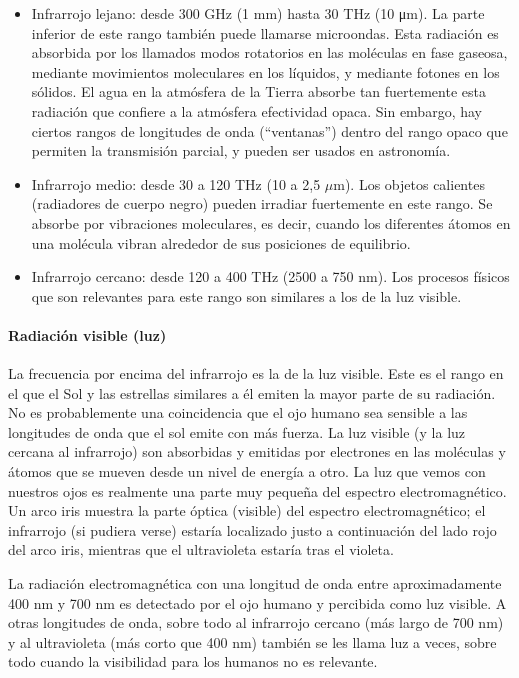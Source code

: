\documentclass[12pt]{article}
\begin{document}
\begin{itemize}
	\item Infrarrojo lejano: desde 300 GHz (1 mm) hasta 30 THz (10 μm). La parte inferior de este rango tambi\'en puede llamarse microondas. Esta radiaci\'on es absorbida por los llamados modos rotatorios en las mol\'eculas en fase gaseosa, mediante movimientos moleculares en los l\'iquidos, y mediante fotones en los s\'olidos. El agua en la atm\'osfera de la Tierra absorbe tan fuertemente esta radiaci\'on que confiere a la atm\'osfera efectividad opaca. Sin embargo, hay ciertos rangos de longitudes de onda (``ventanas'') dentro del rango opaco que permiten la transmisi\'on parcial, y pueden ser usados en astronom\'ia.
	\item Infrarrojo medio: desde 30 a 120 THz (10 a 2,5 $\mu$m). Los objetos calientes (radiadores de cuerpo negro) pueden irradiar fuertemente en este rango. Se absorbe por vibraciones moleculares, es decir, cuando los diferentes \'atomos en una mol\'ecula vibran alrededor de sus posiciones de equilibrio.
	\item Infrarrojo cercano: desde 120 a 400 THz (2500 a 750 nm). Los procesos f\'isicos que son relevantes para este rango son similares a los de la luz visible.
\end{itemize}

\paragraph{Radiaci\'on visible (luz)}
La frecuencia por encima del infrarrojo es la de la luz visible. Este es el rango en el que el Sol y las estrellas similares a \'el emiten la mayor parte de su radiaci\'on. No es probablemente una coincidencia que el ojo humano sea sensible a las longitudes de onda que el sol emite con m\'as fuerza. La luz visible (y la luz cercana al infrarrojo) son absorbidas y emitidas por electrones en las mol\'eculas y \'atomos que se mueven desde un nivel de energ\'ia a otro. La luz que vemos con nuestros ojos es realmente una parte muy peque\~na del espectro electromagn\'etico. Un arco iris muestra la parte \'optica (visible) del espectro electromagn\'etico; el infrarrojo (si pudiera verse) estar\'ia localizado justo a continuaci\'on del lado rojo del arco iris, mientras que el ultravioleta estar\'ia tras el violeta.
\vspace{0.4cm}

La radiaci\'on electromagn\'etica con una longitud de onda entre aproximadamente 400 nm y 700 nm es detectado por el ojo humano y percibida como luz visible. A otras longitudes de onda, sobre todo al infrarrojo cercano (m\'as largo de 700 nm) y al ultravioleta (m\'as corto que 400 nm) tambi\'en se les llama luz a veces, sobre todo cuando la visibilidad para los humanos no es relevante.
\vspace{0.4cm}
\end{document}

